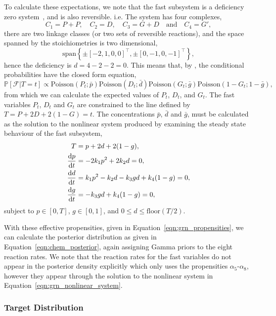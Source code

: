 \documentclass[final]{siamltex}
\begin{document}
To calculate these expectations, we note that the fast subsystem is a deficiency zero system~\cite{anderson2010product}, and is also reversible. i.e. The system has four complexes, 
\[
	C_1 = P+P, \quad C_2 = D, \quad C_3 = G+D \quad \text{and} \quad  C_4 = G',
\]
there are two linkage classes (or two sets of reversible reactions), and the space spanned by the stoichiometries is two dimensional,
\[
	\text{span}\left\{\pm[-2, 1, 0, 0]^\top, \pm[0, -1, 0, -1]^\top\right\},
\]
hence the deficiency is $d = 4 - 2 - 2 = 0$. This means that, by \cite{anderson2010product}, the conditional probabilities have the closed form equation,
\[
	\mathbb{P}[\mathcal{F}|T=t] \propto \text{Poisson}(P_t;\bar{p})\text{Poisson}(D_t;\bar{d})\text{Poisson}(G_t;\bar{g})\text{Poisson}(1-G_t;1-\bar{g}),
\]
from which we can calculate the expected values of $P_t$, $D_t$, and $G_t$. The fast variables $P_t$, $D_t$ and $G_t$ are constrained to the line defined by $T=P+2D+2(1-G)=t$. The concentrations $\bar{p}$, $\bar{d}$ and $\bar{g}$, must be calculated as the solution to the nonlinear system produced by examining the steady state behaviour of the fast subsystem,
\begin{align}
	T &= p + 2d + 2(1-g), \notag\\
	\frac{\text{d}p}{\text{d}t} &= -2k_1p^2+2k_2d = 0, \notag\\
	\frac{\text{d}d}{\text{d}t} &= k_1p^2 - k_2d - k_3gd + k_4(1-g) = 0, \notag\\
	\frac{\text{d}g}{\text{d}t} &= -k_3gd + k_4(1-g) = 0, \label{eqn:grn_nonlinear_system}
\end{align}
subject to $p \in [0, T]$, $g \in [0, 1]$, and $0 \leq d \leq \text{floor}(T/2)$.

With these effective propensities, given in Equation~\eqref{eqn:grn_propensities}, we can calculate the posterior distribution as given in Equation~\eqref{eqn:chem_posterior}, again assigning Gamma priors to the eight reaction rates. We note that the reaction rates for the fast variables do not appear in the posterior density explicitly which only uses the propensities $\alpha_5$-$\alpha_8$, however they appear through the solution to the nonlinear system in Equation~\eqref{eqn:grn_nonlinear_system}.

\subsubsection{Target Distribution}
\end{document}
